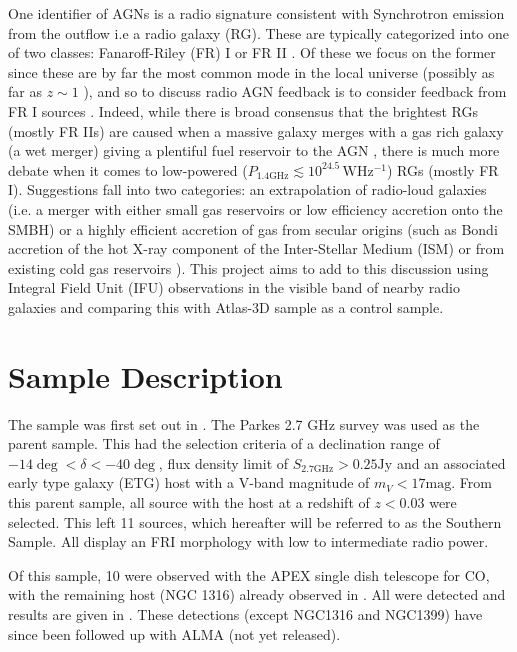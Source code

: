 \documentclass[fleqn,usenatbib,useAMS]{mnras}
\begin{document}
	One identifier of AGNs is a radio signature consistent with Synchrotron emission from the outflow i.e a radio galaxy (RG). These are typically categorized into one of two classes: Fanaroff-Riley (FR) I or FR II \citep{Fanaroff1974}. Of these we focus on the former since these are by far the most common mode in the local universe (possibly as far as $z \sim 1$ \citep{Rigby2008}), and so to discuss radio AGN feedback is to consider feedback from FR I sources \citep{DeYoung2010}. Indeed, while there is broad consensus \citep{Heckman1986, Baum1992} that the brightest RGs (mostly FR IIs) are caused when a massive galaxy merges with a gas rich galaxy (a wet merger) giving a plentiful fuel reservoir to the AGN \citep{Baum1992}, there is much more debate when it comes to low-powered ($P_\mathrm{1.4 GHz} \lesssim 10^{24.5} \, \mathrm{W Hz^{-1}}$) RGs (mostly FR I). Suggestions fall into two categories: an extrapolation of radio-loud galaxies (i.e. a merger with either small gas reservoirs or low efficiency accretion onto the SMBH) or a highly efficient accretion of gas from secular origins (such as Bondi accretion of the hot X-ray component of the Inter-Stellar Medium (ISM) \citep{Allen2006} or from existing cold gas reservoirs \citep{Prandoni2010}). This project aims to add to this discussion using Integral Field Unit (IFU) observations in the visible band of nearby radio galaxies and comparing this with Atlas-3D sample \citep{Cappellari2011} as a control sample.


\section{Sample Description}
	\label{sec:samp}
	The sample was first set out in \citet{Prandoni2010}. The Parkes 2.7 GHz survey was used as the parent sample. This had the selection criteria of a declination range of $-14\deg < \delta < -40\deg$, flux density limit of $S_\mathrm{2.7 GHz} > 0.25 \mathrm{Jy}$ and an associated early type galaxy (ETG) host with a V-band magnitude of $m_V < 17 \mathrm{mag}$. From this parent sample, all source with the host at a redshift of $z<0.03$ were selected. This left 11 sources, which hereafter will be referred to as the Southern Sample. All display an FRI morphology with low to intermediate radio power.

	Of this sample, 10 were observed with the APEX single dish telescope for CO, with the remaining host (NGC 1316) already observed in \citet{Horellou2001}. All were detected and results are given in \citet{Prandoni2010}. These detections (except NGC1316 and NGC1399) have since been followed up with ALMA (not yet released). 
\end{document}
